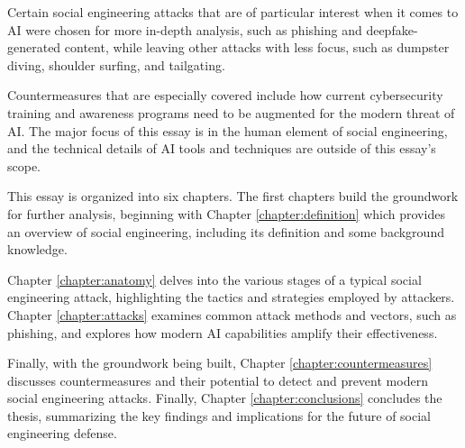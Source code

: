 
Certain social engineering attacks that are of particular interest when it comes to AI were chosen for more in-depth analysis, such as phishing and deepfake-generated content, while leaving other attacks with less focus, such as dumpster diving, shoulder surfing, and tailgating.

Countermeasures that are especially covered include how current cybersecurity training and awareness programs need to be augmented for the modern threat of AI. The major focus of this essay is in the human element of social engineering, and the technical details of AI tools and techniques are outside of this essay's scope.


This essay is organized into six chapters. The first chapters build the groundwork for further analysis, beginning with Chapter \ref{chapter:definition} which provides an overview of social engineering, including its definition and some background knowledge.


Chapter \ref{chapter:anatomy} delves into the various stages of a typical social engineering attack, highlighting the tactics and strategies employed by attackers. Chapter \ref{chapter:attacks} examines common attack methods and vectors, such as phishing, and explores how modern AI capabilities amplify their effectiveness.

Finally, with the groundwork being built, Chapter \ref{chapter:countermeasures} discusses countermeasures and their potential to detect and prevent modern social engineering attacks. Finally, Chapter \ref{chapter:conclusions} concludes the thesis, summarizing the key findings and implications for the future of social engineering defense.



